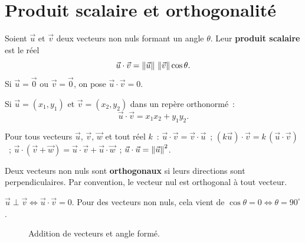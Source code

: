 \section{Produit scalaire et orthogonalit\'e}

\begin{defn}
Soient $\vec u$ et $\vec v$ deux vecteurs non nuls formant un angle $\theta$.
Leur \textbf{produit scalaire} est le r\'eel
$$\vec u\cdot\vec v=\left\|\vec u\right\|\,\left\|\vec v\right\|\cos\theta.$$
Si $\vec u=\vec0$ ou $\vec v=\vec0$, on pose $\vec u\cdot\vec v=0$.
\end{defn}

\begin{prop}
Si $\vec{u}=(x_1,y_1)$ et $\vec{v}=(x_2,y_2)$ dans un rep\`ere orthonorm\'e~:
$$\vec{u} \cdot \vec{v} = x_1 x_2 + y_1 y_2.$$
\end{prop}

\begin{prop}
Pour tous vecteurs $\vec u$, $\vec v$, $\vec w$ et tout r\'eel $k$~:
$\vec u\cdot\vec v=\vec v\cdot\vec u$~;
$(k\vec u)\cdot\vec v=k\,(\vec u\cdot\vec v)$~;
$\vec u\cdot(\vec v+\vec w)=\vec u\cdot\vec v+\vec u\cdot\vec w$~;
$\vec u\cdot\vec u=\left\|\vec u\right\|^2$.
\end{prop}

\begin{defn}
Deux vecteurs non nuls sont \textbf{orthogonaux} si leurs directions sont
perpendiculaires. Par convention, le vecteur nul est orthogonal \`a tout vecteur.
\end{defn}

\begin{prop}
$\vec{u} \perp \vec{v} \Leftrightarrow \vec{u}\cdot\vec{v}=0$.
Pour des vecteurs non nuls, cela vient de $\cos\theta=0\Leftrightarrow\theta=90^{\circ}$.
\end{prop}

\begin{figure}[H]
\centering
{}
\caption{Addition de vecteurs et angle form\'e.}
\end{figure}


